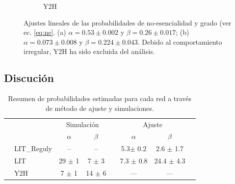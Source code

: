 \begin{figure}[!ht]
\begin{subfigure}[b]{0.4\columnwidth}
        \caption{\label{fig:y2h} Y2H}
    \end{subfigure}
    \caption{\label{fig:fit} Ajustes lineales de las probabilidades de no-esencialidad y grado (ver ec. \ref{eq:ne}. 
    (a) $\alpha = 0.53 \pm 0.002 $ y $\beta = 0.26 \pm 0.017$; (b) $\alpha = 0.073 \pm 0.008$ y $\beta = 0.224 \pm 0.043$. 
    Debido al comportamiento irregular, Y2H ha sido excluida del an\'alisis.}
\end{figure}





\subsection{Discuci\'on}
\begin{table}[!ht]
    \centering
    \caption{\label{tab:probas} Resumen de probabilidades estimadas para cada red a trav\'es de m\'etodo de ajuste
y simulaciones.}
    {\scriptsize
    \begin{tabularx}{.9\columnwidth}{XlccXccX}
        \hline\hline
        &               &  \multicolumn{2}{c}{Simulaci\'on}  &&  \multicolumn{2}{c}{Ajuste}          &      \\
        \cline{3-4} \cline{6-7}
        &               &   $\alpha$    & $\beta$        &&   $\alpha$       &       $\beta$     & \\
        \hline
        & LIT\_Reguly   & --  & --     && 5.3$ \pm$ 0.2  & 2.6 $\pm$ 1.7       &               \\
        & LIT           & 29 $\pm$ 1 & 7 $\pm$ 3   && 7.3 $\pm$ 0.8  & 24.4 $\pm$ 4.3       &               \\
        & Y2H           &  7 $\pm$ 1 & 14 $\pm$ 6  &&    ---             &   ---              &               \\
        \hline\hline
    \end{tabularx}
    }
\end{table}


